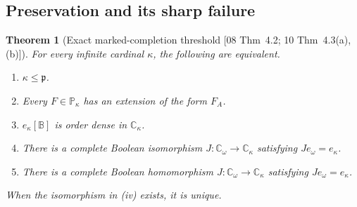 \documentclass[11pt,letterpaper]{article}
\newtheorem{theorem}{Theorem}[section]
\theoremstyle{definition}
\theoremstyle{remark}
\newcommand{\om}{\omega}
\newcommand{\B}{\mathbb B}
\newcommand{\C}{\mathbb C}
\newcommand{\PP}{\mathbb P}
\newcommand{\cp}{\mathfrak p}
\newcommand{\src}[1]{\textup{[#1]}}
\begin{document}
\subsection{Preservation and its sharp failure}
\begin{theorem}[Exact marked-completion threshold \src{08 Thm~4.2; 10 Thm~4.3(a),(b)}]
\label{fbc:thm:p-threshold}
For every infinite cardinal $\kappa$, the following are equivalent.
\begin{enumerate}[label=\textup{(\roman*)}]
\item $\kappa\leq\cp$.
\item Every $F\in\PP_\kappa$ has an extension of the form $F_A$.
\item $e_\kappa[\B]$ is order dense in $\C_\kappa$.
\item There is a complete Boolean isomorphism
$J:\C_\om\to\C_\kappa$ satisfying $J e_\om=e_\kappa$.
\item There is a complete Boolean homomorphism
$J:\C_\om\to\C_\kappa$ satisfying $J e_\om=e_\kappa$.
\end{enumerate}
When the isomorphism in \textup{(iv)} exists, it is unique.
\end{theorem}
\end{document}
